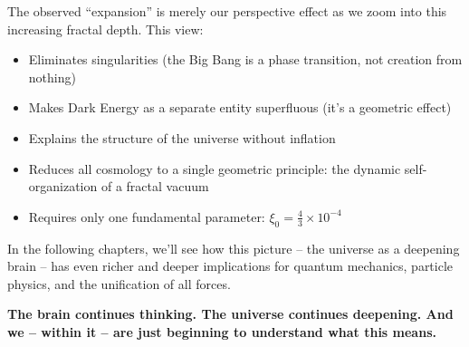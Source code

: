 \documentclass[12pt,a4paper]{article}
\begin{document}
The observed ``expansion'' is merely our perspective effect as we zoom into this increasing fractal depth. This view:

\begin{itemize}[leftmargin=*]
\item Eliminates singularities (the Big Bang is a phase transition, not creation from nothing)
\item Makes Dark Energy as a separate entity superfluous (it's a geometric effect)
\item Explains the structure of the universe without inflation
\item Reduces all cosmology to a single geometric principle: the dynamic self-organization of a fractal vacuum
\item Requires only one fundamental parameter: $\xi_0 = \frac{4}{3} \times 10^{-4}$
\end{itemize}

In the following chapters, we'll see how this picture -- the universe as a deepening brain -- has even richer and deeper implications for quantum mechanics, particle physics, and the unification of all forces.

\textbf{The brain continues thinking. The universe continues deepening. And we -- within it -- are just beginning to understand what this means.}
\end{document}
